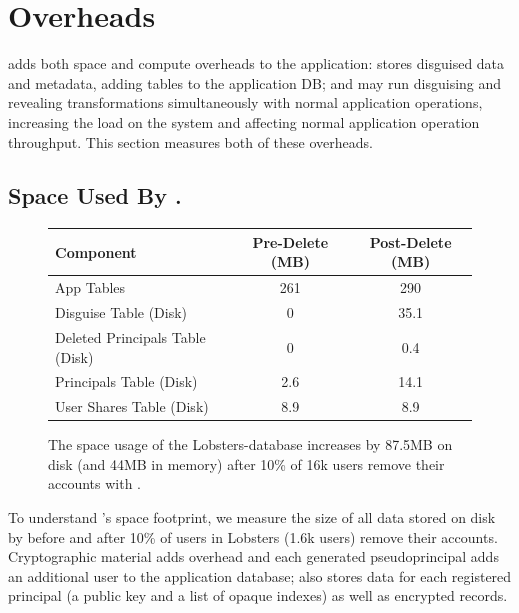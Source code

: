\section{\sys Overheads}
\label{s:eval-overheads}

\sys adds both space and compute overheads to the application: \sys stores
disguised data and metadata, adding tables to the application DB; and \sys may
run disguising and revealing transformations simultaneously with normal
application operations, increasing the load on the system and affecting normal
application operation throughput.
%
This section
measures both of these overheads.

\subsection{Space Used By \sys.}

\begin{figure}[t]
\centering
\begin{tabular}{lcc}
    \textbf{Component} & \textbf{Pre-Delete (MB)} & \textbf{Post-Delete (MB)} \\
\hline
    App Tables & 261 & 290\\
    Disguise Table (Disk) & 0 & 35.1\\
    Deleted Principals Table (Disk) & 0 & 0.4\\
    Principals Table (Disk) & 2.6 & 14.1 \\
    User Shares Table (Disk) & 8.9 & 8.9\\
\end{tabular}
    \caption[Space overhead of \sys.]{The space usage of the Lobsters-\sys database increases by 87.5MB on disk (and 44MB
    in memory) after 10\% of 16k
    users remove their accounts with \sys.}
    \label{f:storage}
\end{figure}

%
To understand \sys's space footprint, we measure the size of all data stored
on disk by \sys before and after 10\% of users in Lobsters (1.6k users)
remove their accounts.
%
%
Cryptographic material adds overhead and each generated pseudoprincipal adds an
additional user to the application database; \sys also stores data for each
registered principal (a public key and a list of opaque indexes) as well as
encrypted records.
%
%

